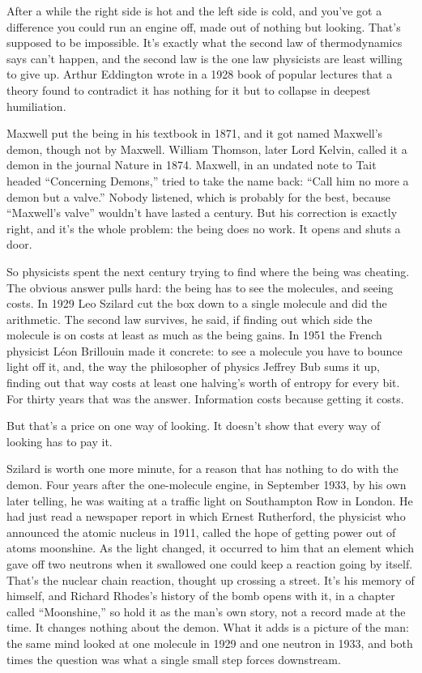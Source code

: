 \documentclass[11pt,twoside]{article}
\theoremstyle{thielethm}
\theoremstyle{thieledef}
\theoremstyle{thieledef}
\theoremstyle{thieledef}
\theoremstyle{thielethm}
\theoremstyle{thieleobs}
\theoremstyle{thielethm}
\begin{document}
After a while the right side is hot and the left side is cold, and you've got a difference you could run an engine off, made out of nothing but looking. That's supposed to be impossible. It's exactly what the second law of thermodynamics says can't happen, and the second law is the one law physicists are least willing to give up. Arthur Eddington wrote in a 1928 book of popular lectures that a theory found to contradict it has nothing for it but to collapse in deepest humiliation.

Maxwell put the being in his textbook in 1871, and it got named Maxwell's demon, though not by Maxwell. William Thomson, later Lord Kelvin, called it a demon in the journal Nature in 1874. Maxwell, in an undated note to Tait headed ``Concerning Demons,'' tried to take the name back: ``Call him no more a demon but a valve.'' Nobody listened, which is probably for the best, because ``Maxwell's valve'' wouldn't have lasted a century. But his correction is exactly right, and it's the whole problem: the being does no work. It opens and shuts a door.

So physicists spent the next century trying to find where the being was cheating. The obvious answer pulls hard: the being has to see the molecules, and seeing costs. In 1929 Leo Szilard cut the box down to a single molecule and did the arithmetic. The second law survives, he said, if finding out which side the molecule is on costs at least as much as the being gains. In 1951 the French physicist Léon Brillouin made it concrete: to see a molecule you have to bounce light off it, and, the way the philosopher of physics Jeffrey Bub sums it up, finding out that way costs at least one halving's worth of entropy for every bit. For thirty years that was the answer. Information costs because getting it costs.

But that's a price on one way of looking. It doesn't show that every way of looking has to pay it.

Szilard is worth one more minute, for a reason that has nothing to do with the demon. Four years after the one-molecule engine, in September 1933, by his own later telling, he was waiting at a traffic light on Southampton Row in London. He had just read a newspaper report in which Ernest Rutherford, the physicist who announced the atomic nucleus in 1911, called the hope of getting power out of atoms moonshine. As the light changed, it occurred to him that an element which gave off two neutrons when it swallowed one could keep a reaction going by itself. That's the nuclear chain reaction, thought up crossing a street. It's his memory of himself, and Richard Rhodes's history of the bomb opens with it, in a chapter called ``Moonshine,'' so hold it as the man's own story, not a record made at the time. It changes nothing about the demon. What it adds is a picture of the man: the same mind looked at one molecule in 1929 and one neutron in 1933, and both times the question was what a single small step forces downstream.
\end{document}
